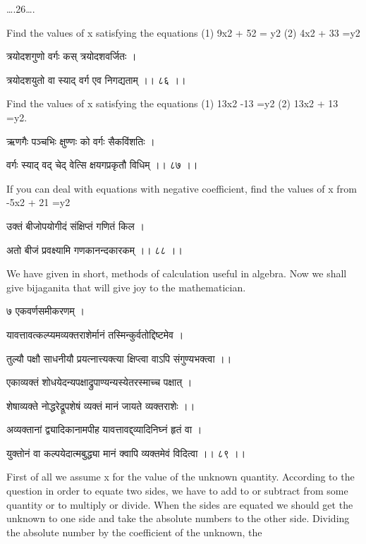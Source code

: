 \documentclass[]{article}
\date{}
\begin{document}
{\ldots{}.26\ldots{}. }

{Find the values of x satisfying the equations (1) 9x}{2}{ + 52 = y}{2}{
(2) 4x}{2}{ + 33 =y}{2}

{त्रयोदशगुणो वर्गः कस् त्रयोदशवर्जितः । }

{त्रयोदशयुतो वा स्याद् वर्ग एव निगद्यताम् ।। ८६ ।। }

{Find the values of x satisfying the equations (1) 13x}{2}{ -13 =y}{2}{
(2) 13x}{2}{ + 13 =y}{2}{.}

{ऋणगैः पञ्चभिः क्षुण्णः को वर्गः सैकविंशतिः । }

{वर्गः स्याद् वद् चेद् वेत्सि क्षयगप्रकृतौ विधिम् ।। ८७ ।। }

{If you can deal with equations with negative coefficient, find the
values of x from -5x}{2}{ + 21 =y}{2}

{उक्तं बीजोपयोगीदं संक्षिप्तं गणितं किल । }

{अतो बीजं प्रवक्ष्यामि गणकानन्दकारकम् ।। ८८ ।। }

{We have given in short, methods of calculation useful in algebra. Now
we shall give bijaganita that will give joy to the mathematician.}

{७ एकवर्णसमीकरणम् । }

{यावत्तावत्कल्प्यमव्यक्तराशेर्मानं तस्मिन्कुर्वतोद्दिष्टमेव । }

{तुल्यौ पक्षौ साधनीयौ प्रयत्नात्त्यक्त्या क्षिप्त्वा वाऽपि
संगुण्यभक्त्वा ।। }

{एकाव्यक्तं शोधयेदन्यपक्षाद्रुपाण्यन्यस्येतरस्माच्च पक्षात् । }

{शेषाव्यक्ते नोद्धरेद्रूपशेषं व्यक्तं मानं जायते व्यक्तराशेः ।। }

{अव्यक्तानां द्व्यादिकानामपीह यावत्तावद्द्व्यादिनिघ्नं हृतं वा । }

{युक्तोनं वा कल्पयेदात्मबुद्ध्या मानं क्वापि व्यक्तमेवं विदित्वा ।। ८९
।। }

{First of all we assume x for the value of the unknown quantity.
According to the question in order to equate two sides, we have to add
to or subtract from some quantity or to multiply or divide. When the
sides are equated we should get the unknown to one side and take the
absolute numbers to the other side. Dividing the absolute number by the
coefficient of the unknown, the\\
}
\end{document}
